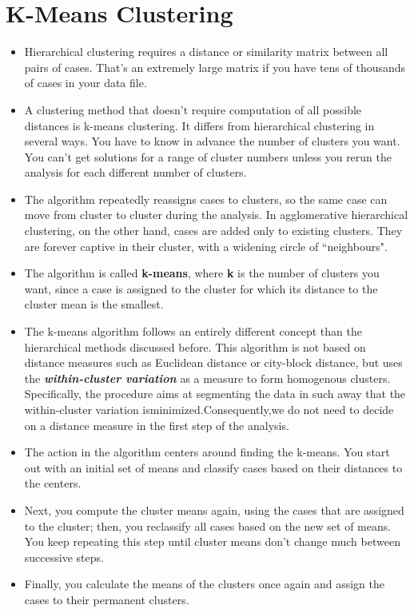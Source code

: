 \documentclass[a4paper,12pt]{article}
\begin{document}
\section{K-Means Clustering}
\begin{itemize}
	\item Hierarchical clustering requires a distance or similarity matrix between all pairs of cases. That's an extremely large matrix if you have tens of thousands of cases in your data file.
	
	\item A clustering method that doesn't require computation of all possible distances is k-means clustering. It differs from hierarchical clustering in several ways. You have to know in advance the number of clusters you want. You can't get solutions for a range of cluster numbers unless you rerun the analysis for each different number of clusters.
	
	\item The algorithm repeatedly reassigns cases to clusters, so the same case can move from cluster to cluster during the analysis. In agglomerative hierarchical clustering, on the other hand, cases are added only to existing clusters. They are forever captive in their cluster, with a widening circle of ``neighbours".
	
	\item The algorithm is called \textbf{k-means}, where \textbf{k} is the number of clusters you want, since a case is assigned to the cluster for which its distance to the cluster mean is the smallest.
	
	\item The k-means algorithm follows an entirely different concept than the hierarchical methods
	discussed before. This algorithm is not based on distance measures such as
	Euclidean distance or city-block distance, but uses the \textbf{\textit{within-cluster variation}} as a measure to form homogenous clusters. Specifically, the procedure aims at segmenting
	the data in such away that the within-cluster variation isminimized.Consequently,we
	do not need to decide on a distance measure in the first step of the analysis.
	
	\item The action in the algorithm centers around finding the k-means. You start out with an initial set of means and classify cases based on their distances to the centers.
	
	\item Next, you compute the cluster means again, using the cases that are assigned to the cluster; then, you reclassify all cases based on the new set of means. You keep repeating this step until cluster means don't change much between successive steps.
	
	\item Finally, you calculate the means of the clusters once again and assign the cases to their permanent clusters.
\end{itemize}
\end{document}
